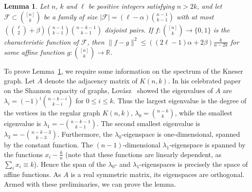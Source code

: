 \documentclass[11pt]{article}
\newtheorem{lemma}[theorem]{Lemma}
\theoremstyle{definition}
\newcommand{\al}{\alpha}
\newcommand{\be}{\beta}
\newcommand{\cF}{\mathcal{F}}
\newcommand{\bekr}{\binom{n-1}{k-1}}
\newcommand{\bnkk}{\binom{n-k-1}{k-1}}
\newcommand{\3}{\bf{3}}
\renewcommand{\l}{\ensuremath{\ell}}
\newcommand{\card}[1]{\left| #1 \right|}
\begin{document}
\begin{lemma} \label{lem:spectral}
Let $n$, $k$ and $\l$ be positive integers satisfying $n>2k$, and let $\cF \subset \binom{[n]}{k}$ be a family of size $\card{\cF} = (\l - \al) \bekr$ with at most $\left(\binom{\l}{2}+\be\right)\bekr \bnkk$ disjoint pairs.  If ${f : \binom{[n]}{k} \rightarrow \{0,1\}}$ is the characteristic function of $\cF$, then $\| f - g \|^2 \le \left((2\l-1) \al + 2\be\right) \frac{k}{n-2k}$ for some affine function $g: \binom{[n]}{k} \rightarrow \mathbb{R}$.
\end{lemma}

To prove Lemma~\ref{lem:spectral}, we require some information on the spectrum of the Kneser graph.  Let $A$ denote the adjacency matrix of $K(n,k)$.  In his celebrated paper on the Shannon capacity of graphs, Lov\'asz~\cite{lov79} showed the eigenvalues of $A$ are $\lambda_i = (-1)^i \binom{n-k-i}{k-i}$ for $0 \le i \le k$.  Thus the largest eigenvalue is the degree of the vertices in the regular graph $K(n,k)$, $\lambda_0 = \binom{n-k}{k}$, while the smallest eigenvalue is $\lambda_1 = - \binom{n-k-1}{k-1}$.  The second smallest eigenvalue is $\lambda_3 = - \binom{n-k-3}{k-3}$.  Furthermore, the $\lambda_0$-eigenspace is one-dimensional, spanned by the constant function.  The $(n-1)$-dimensional $\lambda_1$-eigenspace is spanned by the functions $x_i - \frac{k}{n}$ (note that these functions are linearly dependent, as $\sum_i x_i \equiv k$).  Hence the span of the $\lambda_0$- and $\lambda_1$-eigenspaces is precisely the space of affine functions.  As $A$ is a real symmetric matrix, its eigenspaces are orthogonal.  Armed with these preliminaries, we can prove the lemma.
\end{document}
